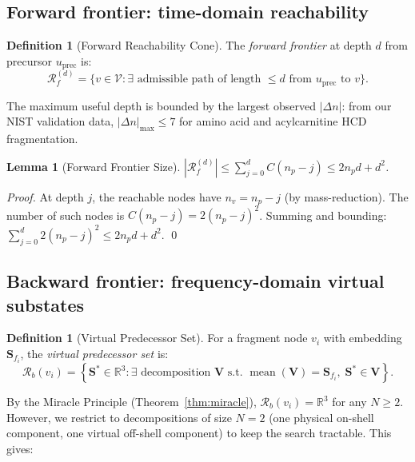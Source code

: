 \documentclass[twocolumn,10pt,a4paper]{article}
\theoremstyle{thmstyle}
\newtheorem{lemma}[theorem]{Lemma}
\theoremstyle{definition}
\newtheorem{definition}[theorem]{Definition}
\theoremstyle{remark}
\newcommand{\R}{\mathbb{R}}
\newcommand{\Sv}{\mathbf{S}}
\newcommand{\calV}{\mathcal{V}}
\newcommand{\Reachf}{\mathcal{R}_f}
\newcommand{\Reachb}{\mathcal{R}_b}
\DeclareMathOperator{\mean}{mean}
\begin{document}
\subsection{Forward frontier: time-domain reachability}

\begin{definition}[Forward Reachability Cone]
\label{def:forward}
The \emph{forward frontier} at depth $d$ from precursor $u_\text{prec}$
is:
\begin{equation}
\Reachf^{(d)} = \bigl\{v \in \calV :
\exists \text{ admissible path of length } \leq d
\text{ from } u_\text{prec} \text{ to } v\bigr\}.
\end{equation}
\end{definition}

The maximum useful depth is bounded by the largest observed $|\Delta n|$:
from our NIST validation data, $|\Delta n|_\text{max} \leq 7$ for
amino acid and acylcarnitine HCD fragmentation.

\begin{lemma}[Forward Frontier Size]
\label{lem:forward-size}
$|\Reachf^{(d)}| \leq \sum_{j=0}^{d} C(n_p - j) \leq 2n_p d + d^2$.
\end{lemma}

\begin{proof}
At depth $j$, the reachable nodes have $n_v = n_p - j$ (by
mass-reduction). The number of such nodes is $C(n_p - j) = 2(n_p-j)^2$.
Summing and bounding: $\sum_{j=0}^{d} 2(n_p-j)^2 \leq 2n_p d + d^2$.
\qed
\end{proof}

\subsection{Backward frontier: frequency-domain virtual substates}

\begin{definition}[Virtual Predecessor Set]
\label{def:backward}
For a fragment node $v_i$ with embedding $\Sv_{f_i}$, the
\emph{virtual predecessor set} is:
\begin{equation}
\Reachb(v_i) = \left\{\Sv^* \in \R^3 :
\exists \text{ decomposition } \mathbf{V} \text{ s.t. }
\mean(\mathbf{V}) = \Sv_{f_i},\; \Sv^* \in \mathbf{V}\right\}.
\end{equation}
\end{definition}

By the Miracle Principle (Theorem~\ref{thm:miracle}), $\Reachb(v_i)
= \R^3$ for any $N \geq 2$. However, we restrict to decompositions
of size $N = 2$ (one physical on-shell component, one virtual off-shell
component) to keep the search tractable. This gives:
\end{document}
